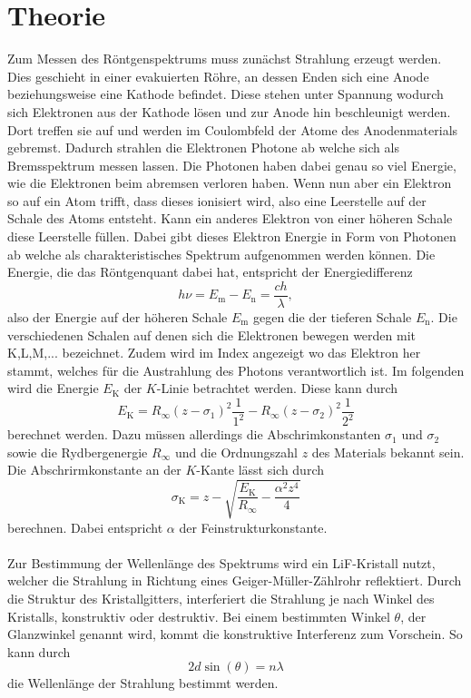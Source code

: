 \section{Theorie}
\label{sec:Theorie}

Zum Messen des Röntgenspektrums muss zunächst Strahlung erzeugt werden.
Dies geschieht in einer evakuierten Röhre, an dessen Enden sich eine Anode beziehungsweise eine Kathode befindet.
Diese stehen unter Spannung wodurch sich Elektronen aus der Kathode lösen und zur Anode hin beschleunigt werden.
Dort treffen sie auf und werden im Coulombfeld der Atome des Anodenmaterials gebremst.
Dadurch strahlen die Elektronen Photone ab welche sich als Bremsspektrum messen lassen.
Die Photonen haben dabei genau so viel Energie, wie die Elektronen beim abremsen verloren haben.
Wenn nun aber ein Elektron so auf ein Atom trifft, dass dieses ionisiert wird, also eine Leerstelle auf der Schale des Atoms entsteht.
Kann ein anderes Elektron von einer höheren Schale diese Leerstelle füllen.
Dabei gibt dieses Elektron Energie in Form von Photonen ab welche als charakteristisches Spektrum aufgenommen werden können.
Die Energie, die das Röntgenquant dabei hat, entspricht der Energiedifferenz 
\begin{equation}
    h \nu = E_ \text{m} - E_ \text{n} = \frac{ch}{\lambda},
    \label{eq:eng}
\end{equation}
also der Energie auf der höheren Schale $E_ \text{m}$ gegen die der tieferen Schale $E_\text{n}$.
Die verschiedenen Schalen auf denen sich die Elektronen bewegen werden mit K,L,M,... bezeichnet.
Zudem wird im Index angezeigt wo das Elektron her stammt, welches für die Austrahlung des Photons verantwortlich ist.
Im folgenden wird die Energie $E_ \text{K}$ der $K$-Linie betrachtet werden.
Diese kann durch 
\begin{equation}
    E_ \text{K} = R_ \infty (z - \sigma_1)^2 \frac{1}{1^2} - R_ \infty (z-\sigma_2)^2 \frac{1}{2^2}
    \label{eq:enkkante}
\end{equation}
berechnet werden.
Dazu müssen allerdings die Abschrimkonstanten $\sigma_1 $ und $\sigma_2$ sowie die Rydbergenergie $R_\infty$ und die Ordnungszahl $z$ des Materials bekannt sein.
Die Abschrirmkonstante an der $K$-Kante lässt sich durch 
\begin{equation}
    \sigma_ \text{K} = z - \sqrt{\frac{E_\text{K}}{R_\infty} - \frac{\alpha^2 z^4}{4}}
    \label{eq:sigma}
\end{equation}
berechnen.
Dabei entspricht $\alpha$ der Feinstrukturkonstante.
\\\\
Zur Bestimmung der Wellenlänge des Spektrums wird ein LiF-Kristall nutzt, welcher die Strahlung in Richtung eines Geiger-Müller-Zählrohr reflektiert.
Durch die Struktur des Kristallgitters, interferiert die Strahlung je nach Winkel des Kristalls, konstruktiv oder destruktiv.
Bei einem bestimmten Winkel $\theta$, der Glanzwinkel genannt wird, kommt die konstruktive Interferenz zum Vorschein.
So kann durch
\begin{equation}
    2d\sin(\theta) = n \lambda
    \label{eq:bragg}
\end{equation}
die Wellenlänge der Strahlung bestimmt werden.
